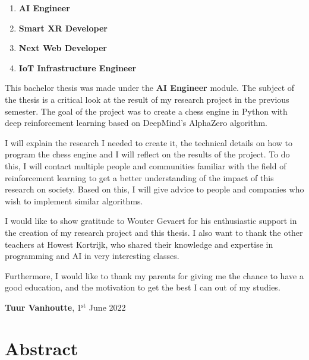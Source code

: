 \documentclass{article}
\begin{document}
\begin{enumerate}
    \item \textbf{AI Engineer}
    \item \textbf{Smart XR Developer}
    \item \textbf{Next Web Developer}
    \item \textbf{IoT Infrastructure Engineer}
\end{enumerate}

This bachelor thesis was made under the \textbf{AI Engineer} module.
The subject of the thesis is a critical look at the result of my research project 
in the previous semester. The goal of the project was to create a chess engine in Python with
deep reinforcement learning based on DeepMind's AlphaZero algorithm. 

I will explain the research I needed to create it, the technical details on how to program the
chess engine and I will reflect on the results of the project. To do this, I will contact 
multiple people and communities familiar with the field of reinforcement learning to get a better understanding of the
impact of this research on society. Based on this, I will give advice to people and companies who 
wish to implement similar algorithms.

I would like to show gratitude to Wouter Gevaert for his enthusiastic support in the creation of my research project 
and this thesis. I also want to thank the other teachers at Howest Kortrijk, who shared their knowledge
and expertise in programming and AI in very interesting classes.


Furthermore, I would like to thank my parents for giving me the chance to have a good education, and 
the motivation to get the best I can out of my studies.

\vspace{3em}

\begin{center}
    \textbf{Tuur Vanhoutte}, 1$^{\text{st}}$ June 2022 %
\end{center}

\newpage
\thispagestyle{empty}
\mbox{}
\newpage

\section*{Abstract}
\end{document}
